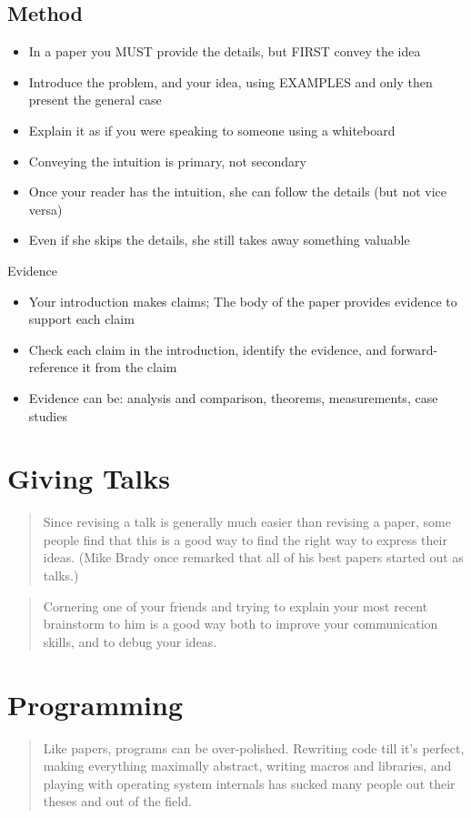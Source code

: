 \subsection{Method}
\begin{itemize}
\item In a paper you MUST provide the details,
but FIRST convey the idea
\item Introduce the problem, and your idea, using
EXAMPLES and only then present the general case
\item Explain it as if you were speaking to someone using
a whiteboard
\item Conveying the intuition is primary, not secondary
\item Once your reader has the intuition, she can follow
the details (but not vice versa)
\item Even if she skips the details, she still takes away
something valuable
\end{itemize}

Evidence
\begin{itemize}
\item Your introduction makes claims; The body of the paper provides evidence to support each claim
\item Check each claim in the introduction, identify the
evidence, and forward-reference it from the claim
\item Evidence can be: analysis and comparison, theorems,
measurements, case studies
\end{itemize}


\section{Giving Talks}
\blockquote{Since revising a talk is generally much easier than revising a
paper, some people find that this is a good way to find the right way to express
their ideas. (Mike Brady once remarked that all of his best papers started out
as talks.)}

\blockquote{Cornering one of your friends and trying to explain your most recent
brainstorm to him is a good way both to improve your communication skills, and
to debug your ideas.}




\section{Programming}
\blockquote{Like papers, programs can be over-polished. Rewriting code till it’s
perfect, making everything maximally abstract, writing macros and libraries, and
playing with operating system internals has sucked many people out their theses
and out of the field.}

